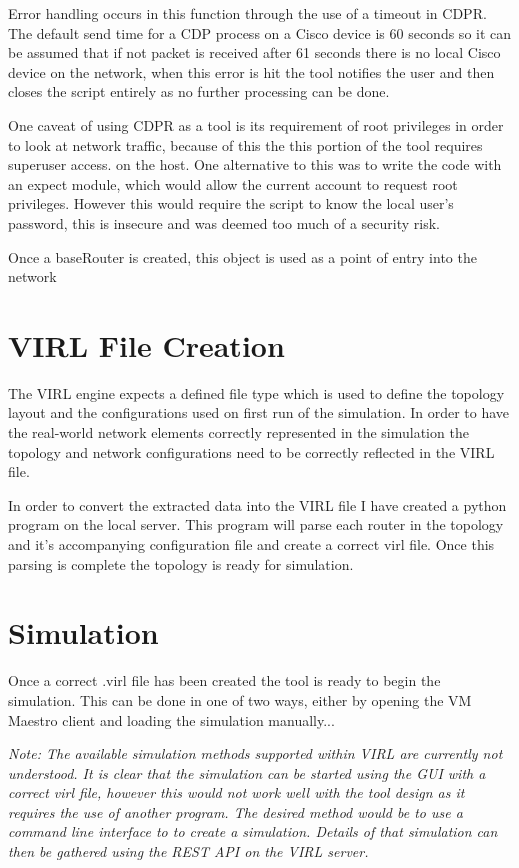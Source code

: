 \documentclass[11pt]{report}
\begin{document}
Error handling occurs in this function through the use of a timeout in CDPR. The default send time for a CDP process on a Cisco device is 60 seconds so it can be assumed that if not packet is received after 61 seconds there is no local Cisco device on the network, when this error is hit the tool notifies the user and then closes the script entirely as no further processing can be done.

One caveat of using CDPR as a tool is its requirement of root privileges in order to look at network traffic, because of this the this portion of the tool requires superuser access. on the host. One alternative to this was to write the code with an expect module, which would allow the current account to request root privileges. However this would require the script to know the local user's password, this is insecure and was deemed too much of a security risk.

Once a baseRouter is created, this object is used as a point of entry into the network

\section{VIRL File Creation}

The VIRL engine expects a defined file type which is used to define the topology layout and the configurations used on first run of the simulation. In order to have the real-world network elements correctly represented in the simulation the topology and network configurations need to be correctly reflected in the VIRL file. 

In order to convert the extracted data into the VIRL file I have created a python program on the local server. This program will parse each router in the topology and it's accompanying configuration file and create a correct virl file. Once this parsing is complete the topology is ready for simulation.

\section{Simulation}

Once a correct .virl file has been created the tool is ready to begin the simulation. This can be done in one of two ways, either by opening the VM Maestro client and loading the simulation manually...

\textit{Note: The available simulation methods supported within VIRL are currently not understood. It is clear that the simulation can be started using the GUI with a correct virl file, however this would not work well with the tool design as it requires the use of another program. The desired method would be to use a command line interface to to create a simulation. Details of that simulation can then be gathered using the REST API on the VIRL server.}
\end{document}
